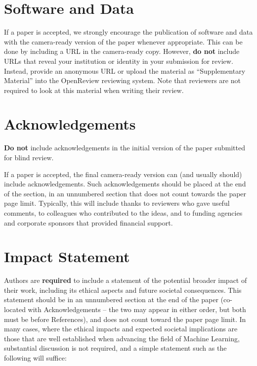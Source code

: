 \documentclass{article}
\theoremstyle{plain}
\theoremstyle{definition}
\theoremstyle{remark}
\begin{document}
\section*{Software and Data}

If a paper is accepted, we strongly encourage the publication of software and
data with the camera-ready version of the paper whenever appropriate. This can
be done by including a URL in the camera-ready copy. However, \textbf{do not}
include URLs that reveal your institution or identity in your submission for
review. Instead, provide an anonymous URL or upload the material as
``Supplementary Material'' into the OpenReview reviewing system. Note that
reviewers are not required to look at this material when writing their review.

\section*{Acknowledgements}

\textbf{Do not} include acknowledgements in the initial version of the paper
submitted for blind review.

If a paper is accepted, the final camera-ready version can (and usually should)
include acknowledgements.  Such acknowledgements should be placed at the end of
the section, in an unnumbered section that does not count towards the paper
page limit. Typically, this will include thanks to reviewers who gave useful
comments, to colleagues who contributed to the ideas, and to funding agencies
and corporate sponsors that provided financial support.

\section*{Impact Statement}

Authors are \textbf{required} to include a statement of the potential broader
impact of their work, including its ethical aspects and future societal
consequences. This statement should be in an unnumbered section at the end of
the paper (co-located with Acknowledgements -- the two may appear in either
order, but both must be before References), and does not count toward the paper
page limit. In many cases, where the ethical impacts and expected societal
implications are those that are well established when advancing the field of
Machine Learning, substantial discussion is not required, and a simple
statement such as the following will suffice:
\end{document}
